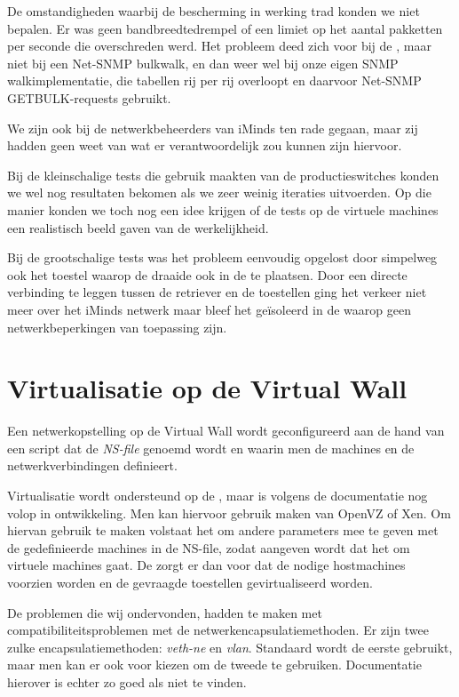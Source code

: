 De omstandigheden waarbij de bescherming in werking trad konden we niet bepalen.
Er was geen bandbreedtedrempel of een limiet op het aantal pakketten per seconde die overschreden werd.
Het probleem deed zich voor bij de \nwmretriever{}, maar niet bij een Net-SNMP bulkwalk,
en dan weer wel bij onze eigen SNMP walkimplementatie, die tabellen rij per rij overloopt en daarvoor Net-SNMP GETBULK-requests gebruikt.

We zijn ook bij de netwerkbeheerders van iMinds ten rade gegaan, maar zij hadden geen weet van wat er verantwoordelijk zou kunnen zijn hiervoor.

Bij de kleinschalige tests die gebruik maakten van de productieswitches konden we wel nog resultaten bekomen als we zeer weinig iteraties uitvoerden.
Op die manier konden we toch nog een idee krijgen of de tests op de virtuele machines een realistisch beeld gaven van de werkelijkheid.

Bij de grootschalige tests was het probleem eenvoudig opgelost door simpelweg ook het toestel waarop de \nwmretriever{} draaide ook in de \vwall{} te plaatsen.
Door een directe verbinding te leggen tussen de retriever en de toestellen ging het verkeer niet meer over het iMinds netwerk maar bleef het geïsoleerd in de \vwall{} waarop geen netwerkbeperkingen van toepassing zijn.


\section{Virtualisatie op de Virtual Wall}
\label{probleem-virtualisatie-vwall}

Een netwerkopstelling op de Virtual Wall wordt geconfigureerd aan de hand van een script dat de \textit{NS-file} genoemd wordt en
waarin men de machines en de netwerkverbindingen definieert.

Virtualisatie wordt ondersteund op de \vwall{}, maar is volgens de documentatie nog volop in ontwikkeling.
Men kan hiervoor gebruik maken van OpenVZ of Xen\cite{vwall-openvz, vwall-xen}.
Om hiervan gebruik te maken volstaat het om andere parameters mee te geven met de gedefinieerde machines in de NS-file,
zodat aangeven wordt dat het om virtuele machines gaat.
De \vwall{} zorgt er dan voor dat de nodige hostmachines voorzien worden en de gevraagde toestellen gevirtualiseerd worden.

De problemen die wij ondervonden, hadden te maken met compatibiliteitsproblemen met de netwerkencapsulatiemethoden.
Er zijn twee zulke encapsulatiemethoden: \textit{veth-ne} en \textit{vlan}.
Standaard wordt de eerste gebruikt, maar men kan er ook voor kiezen om de tweede te gebruiken.
Documentatie hierover is echter zo goed als niet te vinden.

